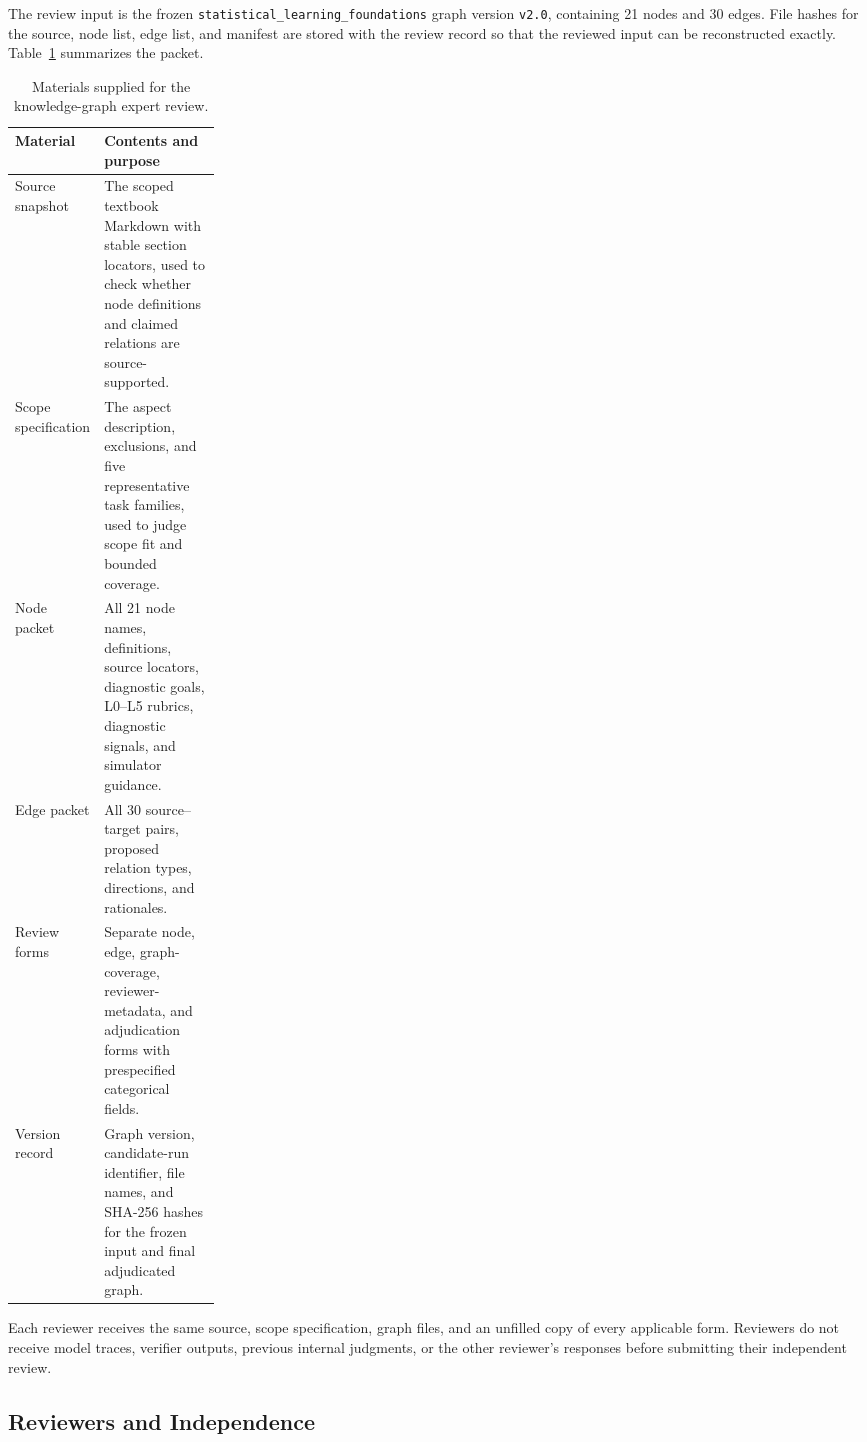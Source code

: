 The review input is the frozen \texttt{statistical\_learning\_foundations} graph version \texttt{v2.0}, containing 21 nodes and 30 edges. File hashes for the source, node list, edge list, and manifest are stored with the review record so that the reviewed input can be reconstructed exactly. Table~\ref{tab:graph-review-materials} summarizes the packet.

\begin{table}[h!]
\caption{Materials supplied for the knowledge-graph expert review.}
\label{tab:graph-review-materials}
\centering
\small
\begin{tabularx}{\linewidth}{>{\raggedright\arraybackslash}p{0.24\linewidth}X}
\toprule
\textbf{Material} & \textbf{Contents and purpose} \\
\midrule
Source snapshot & The scoped textbook Markdown with stable section locators, used to check whether node definitions and claimed relations are source-supported. \\
Scope specification & The aspect description, exclusions, and five representative task families, used to judge scope fit and bounded coverage. \\
Node packet & All 21 node names, definitions, source locators, diagnostic goals, L0--L5 rubrics, diagnostic signals, and simulator guidance. \\
Edge packet & All 30 source--target pairs, proposed relation types, directions, and rationales. \\
Review forms & Separate node, edge, graph-coverage, reviewer-metadata, and adjudication forms with prespecified categorical fields. \\
Version record & Graph version, candidate-run identifier, file names, and SHA-256 hashes for the frozen input and final adjudicated graph. \\
\bottomrule
\end{tabularx}
\end{table}

Each reviewer receives the same source, scope specification, graph files, and an unfilled copy of every applicable form. Reviewers do not receive model traces, verifier outputs, previous internal judgments, or the other reviewer's responses before submitting their independent review.

\subsection{Reviewers and Independence}

